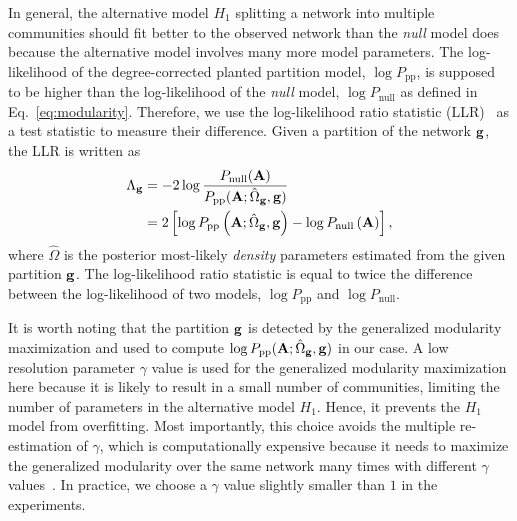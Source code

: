 In general, the alternative model $H_1$ splitting a network into multiple communities should fit better to the observed network than the {\it null} model does because the alternative model involves many more model parameters. The log-likelihood of the degree-corrected planted partition model, $\log P_{\text{pp}}$, is supposed to be higher than the log-likelihood of the {\it null} model, $\log P_{\text{null}}$ as defined in Eq.~\ref{eq:modularity}. Therefore, we use the log-likelihood ratio statistic (LLR)~\cite{ghosh1984asymptotic} as a test statistic to measure their difference. Given a partition of the network $\bf g$, the LLR is written as
\begin{equation} \label{eq:-2ll}
    \begin{split}
    \Lambda_{\bf g} &= -2 \log \frac{P_{\text{null}}({\bf A})}{P_{\text{pp}}({\bf A};\hat{\Omega}_{\bf g},{\bf g})} \\
                      &= 2 \left[ \log P_{\text{pp}} \left( {\bf A};\hat{\Omega}_{\bf g},{\bf g} \right) - \log P_{\text{null}} \left( {\bf A} \right) \right],
    \end{split}
\end{equation}
where $\hat{\Omega}$ is the posterior most-likely {\it density} parameters estimated from the given partition $\bf g$. The log-likelihood ratio statistic is equal to twice the difference between the log-likelihood of two models, $\log P_{\text{pp}}$ and $\log P_{\text{null}}$. 

It is worth noting that the partition $\bf g$ is detected by the generalized modularity maximization and used to compute $\log P_{\text{pp}}({\bf A};\hat{\Omega}_{\bf g},{\bf g})$ in our case. A low resolution parameter $\gamma$ value is used for the generalized modularity maximization here because it is likely to result in a small number of communities, limiting the number of parameters in the alternative model $H_1$. Hence, it prevents the $H_1$ model from overfitting. Most importantly, this choice avoids the multiple re-estimation of $\gamma$, which is computationally expensive because it needs to maximize the generalized modularity over the same network many times with different $\gamma$ values~\cite{newman2016equivalence}. In practice, we choose a $\gamma$ value slightly smaller than $1$ in the experiments.

